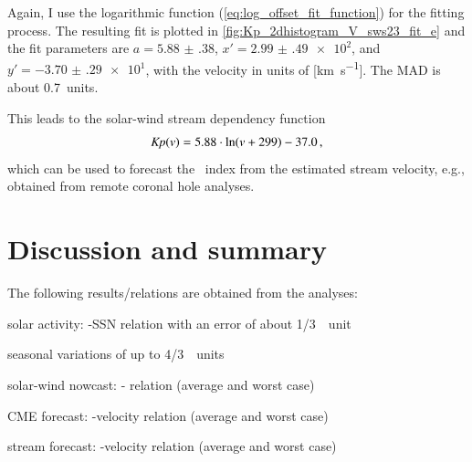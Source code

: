 Again, I use the logarithmic function (\ref{eq:log_offset_fit_function}) for the fitting process. The resulting fit is plotted in \autoref{fig:Kp_2dhistogram_V_sws23_fit_e} and the fit parameters are $a = \num{5.88(38)}$, $x' = \num{2.99(49)e2}$, and $y' = \num{-3.70(29)e1}$, with the velocity in units of [\si{\km\per\s}]. The MAD is about \SI{0.7}{\Kp}~units.
\begin{figure}
\end{figure}
This leads to the solar-wind stream dependency function
\begin{align}
	\textit{Kp}(v) = 5.88 \cdot \ln(v + 299) - 37.0	\,,	\label{eq:kpvsv_stream_dependency_function}
\end{align}
which can be used to forecast the \Kp{}~index from the estimated stream velocity, e.g., obtained from remote coronal hole analyses.


\section{Discussion and summary}
The following results/relations are obtained from the analyses:
\begin{itemize*}
	\item solar activity: \Kp{}-SSN relation with an error of about 1/3~\Kp{}~unit
	\item seasonal variations of up to 4/3~\Kp{}~units
	\item solar-wind nowcast: \Kp-\vBz{} relation (average and worst case)
	\item CME forecast: \Kp-velocity relation (average and worst case)
	\item stream forecast: \Kp-velocity relation (average and worst case)
\end{itemize*}

